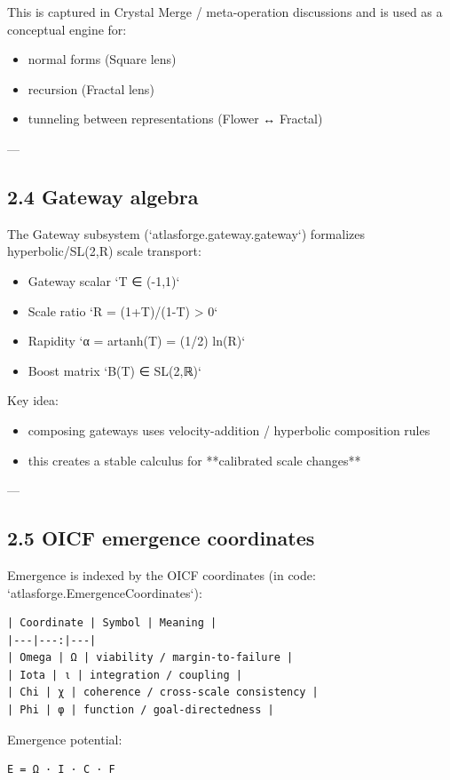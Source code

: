 \documentclass[11pt]{article}
\begin{document}
This is captured in Crystal Merge / meta-operation discussions and is used as a conceptual engine for:
\begin{itemize}
\item normal forms (Square lens)
\item recursion (Fractal lens)
\item tunneling between representations (Flower ↔ Fractal)
\end{itemize}

---

\subsection{2.4 Gateway algebra}

The Gateway subsystem (`atlasforge.gateway.gateway`) formalizes hyperbolic/SL(2,R) scale transport:

\begin{itemize}
\item Gateway scalar `T ∈ (-1,1)`
\item Scale ratio `R = (1+T)/(1-T) > 0`
\item Rapidity `α = artanh(T) = (1/2) ln(R)`
\item Boost matrix `B(T) ∈ SL(2,ℝ)`
\end{itemize}

Key idea:
\begin{itemize}
\item composing gateways uses velocity-addition / hyperbolic composition rules
\item this creates a stable calculus for **calibrated scale changes**
\end{itemize}

---

\subsection{2.5 OICF emergence coordinates}

Emergence is indexed by the OICF coordinates (in code: `atlasforge.EmergenceCoordinates`):

\begin{lstlisting}
| Coordinate | Symbol | Meaning |
|---|---:|---|
| Omega | Ω | viability / margin-to-failure |
| Iota | ι | integration / coupling |
| Chi | χ | coherence / cross-scale consistency |
| Phi | φ | function / goal-directedness |
\end{lstlisting}
Emergence potential:

\begin{lstlisting}
E = Ω · I · C · F
\end{lstlisting}
\end{document}
